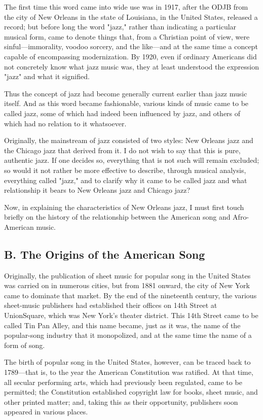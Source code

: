 The first time this word came into wide use was in 1917, after the ODJB from the city of New Orleans in the state of Louisiana, in the United States, released a record; but before long the word "jazz," rather than indicating a particular musical form, came to denote things that, from a Christian point of view, were sinful—immorality, voodoo sorcery, and the like—and at the same time a concept capable of encompassing modernization. By 1920, even if ordinary Americans did not concretely know what jazz music was, they at least understood the expression "jazz" and what it signified.

Thus the concept of jazz had become generally current earlier than jazz music itself. And as this word became fashionable, various kinds of music came to be called jazz, some of which had indeed been influenced by jazz, and others of which had no relation to it whatsoever.

Originally, the mainstream of jazz consisted of two styles: New Orleans jazz and the Chicago jazz that derived from it. I do not wish to say that this is pure, authentic jazz. If one decides so, everything that is not such will remain excluded; so would it not rather be more effective to describe, through musical analysis, everything called "jazz," and to clarify why it came to be called jazz and what relationship it bears to New Orleans jazz and Chicago jazz?

Now, in explaining the characteristics of New Orleans jazz, I must first touch briefly on the history of the relationship between the American song and Afro-American music.

\subsection{B. The Origins of the American Song}

Originally, the publication of sheet music for popular song in the United States was carried on in numerous cities, but from 1881 onward, the city of New York came to dominate that market. By the end of the nineteenth century, the various sheet-music publishers had established their offices on 14th Street at UnionSquare, which was New York's theater district. This 14th Street came to be called Tin Pan Alley, and this name became, just as it was, the name of the popular-song industry that it monopolized, and at the same time the name of a form of song.

The birth of popular song in the United States, however, can be traced back to 1789—that is, to the year the American Constitution was ratified. At that time, all secular performing arts, which had previously been regulated, came to be permitted; the Constitution established copyright law for books, sheet music, and other printed matter; and, taking this as their opportunity, publishers soon appeared in various places.

